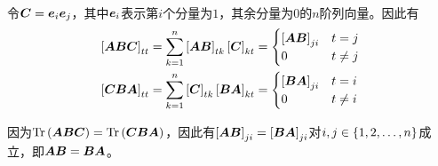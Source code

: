 \documentclass{ctexart}
\begin{document}
\begin{problem}\


令\(\matc=\vece_i\vece_j\)，其中\(\vece_i\)表示第\(i\)个分量为\(1\)，其余分量为\(0\)的\(n\)阶列向量。因此有
\begin{align*}
    \mat{\mata\matb\matc}_{tt} & =\sum_{k=1}^n\mat{\mata\matb}_{tk}\mat{\matc}_{kt}=
    \begin{cases}
        \mat{\mata\matb}_{ji} & t=j     \\
        0                     & t\neq j
    \end{cases}                                                  \\
    \mat{\matc\matb\mata}_{tt} & =\sum_{k=1}^n\mat{\matc}_{tk}\mat{\matb\mata}_{kt}=
    \begin{cases}
        \mat{\matb\mata}_{ji} & t=i     \\
        0                     & t\neq i
    \end{cases}
\end{align*}

因为\(\trace{\mata\matb\matc}=\trace{\matc\matb\mata}\)，因此有\(\mat{\mata\matb}_{ji}=\mat{\matb\mata}_{ji}\)对\(i,j\in\setof{1,2,\dots,n}\)成立，即\(\mata\matb=\matb\mata\)。

\end{problem}
\end{document}
